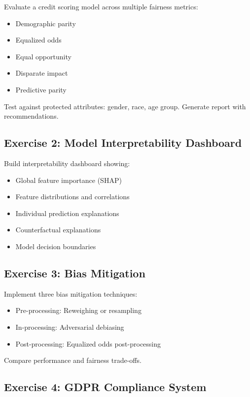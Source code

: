 Evaluate a credit scoring model across multiple fairness metrics:
\begin{itemize}
    \item Demographic parity
    \item Equalized odds
    \item Equal opportunity
    \item Disparate impact
    \item Predictive parity
\end{itemize}

Test against protected attributes: gender, race, age group. Generate report with recommendations.

\subsection{Exercise 2: Model Interpretability Dashboard}

Build interpretability dashboard showing:
\begin{itemize}
    \item Global feature importance (SHAP)
    \item Feature distributions and correlations
    \item Individual prediction explanations
    \item Counterfactual explanations
    \item Model decision boundaries
\end{itemize}

\subsection{Exercise 3: Bias Mitigation}

Implement three bias mitigation techniques:
\begin{itemize}
    \item Pre-processing: Reweighing or resampling
    \item In-processing: Adversarial debiasing
    \item Post-processing: Equalized odds post-processing
\end{itemize}

Compare performance and fairness trade-offs.

\subsection{Exercise 4: GDPR Compliance System}

